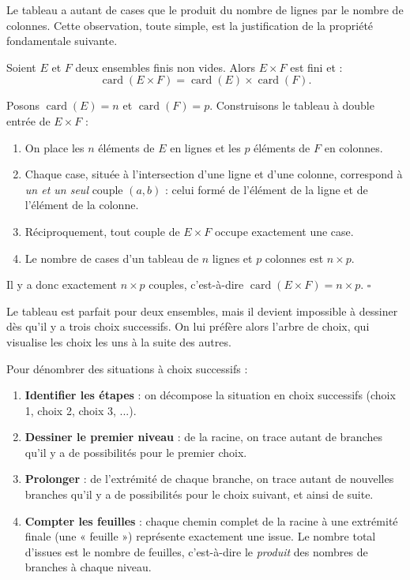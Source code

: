 \documentclass[11pt]{article}
\newcommand{\cle}[1]{{\popxbold\color{popdark}#1}}
\newcounter{popsec}
\newcounter{popsub}
\newcommand{\courssub}[1]{%
  \stepcounter{popsub}%
  \par\vspace{9pt}\noindent{\popxbold\fontsize{11.5}{13}\selectfont\color{popink}{\color{poporange}\thepopsec.\thepopsub}\hspace{6pt}#1}\par\nopagebreak\vspace{4pt}
}
\begin{document}
Le tableau a autant de cases que le produit du nombre de lignes par le nombre de colonnes. Cette observation, toute simple, est la justification de la propriété fondamentale suivante.

\begin{propriete}
Soient $E$ et $F$ deux ensembles finis non vides. Alors $E\times F$ est fini et :
\[ \operatorname{card}(E\times F)=\operatorname{card}(E)\times\operatorname{card}(F). \]
\end{propriete}

\begin{experience}
Posons $\operatorname{card}(E)=n$ et $\operatorname{card}(F)=p$. Construisons le tableau à double entrée de $E\times F$ :
\begin{enumerate}
\item On place les $n$ éléments de $E$ en lignes et les $p$ éléments de $F$ en colonnes.
\item Chaque case, située à l'intersection d'une ligne et d'une colonne, correspond à \emph{un et un seul} couple $(a,b)$ : celui formé de l'élément de la ligne et de l'élément de la colonne.
\item Réciproquement, tout couple de $E\times F$ occupe exactement une case.
\item Le nombre de cases d'un tableau de $n$ lignes et $p$ colonnes est $n\times p$.
\end{enumerate}
Il y a donc exactement $n\times p$ couples, c'est-à-dire $\operatorname{card}(E\times F)=n\times p$. \hfill$\square$
\end{experience}

\courssub{Dénombrement par arbre de choix}

Le tableau est parfait pour deux ensembles, mais il devient impossible à dessiner dès qu'il y a trois choix successifs. On lui préfère alors l'\cle{arbre de choix}, qui visualise les choix les uns à la suite des autres.

\begin{methode}
Pour dénombrer des situations à choix successifs :
\begin{enumerate}
\item \textbf{Identifier les étapes} : on décompose la situation en choix successifs (choix 1, choix 2, choix 3, ...).
\item \textbf{Dessiner le premier niveau} : de la racine, on trace autant de branches qu'il y a de possibilités pour le premier choix.
\item \textbf{Prolonger} : de l'extrémité de chaque branche, on trace autant de nouvelles branches qu'il y a de possibilités pour le choix suivant, et ainsi de suite.
\item \textbf{Compter les feuilles} : chaque chemin complet de la racine à une extrémité finale (une « feuille ») représente exactement une issue. Le nombre total d'issues est le nombre de feuilles, c'est-à-dire le \emph{produit} des nombres de branches à chaque niveau.
\end{enumerate}
\end{methode}
\end{document}
